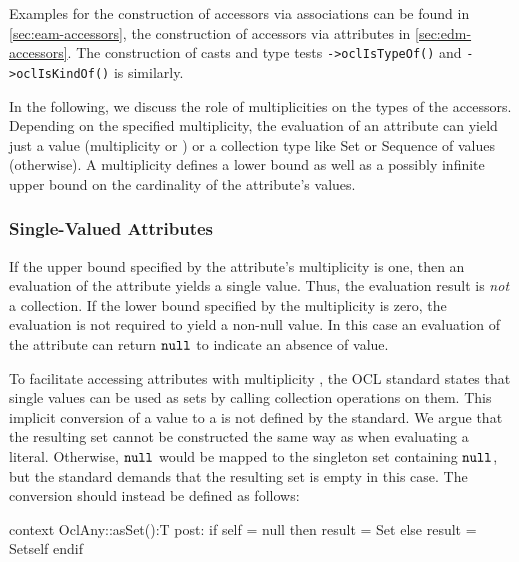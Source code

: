 Examples for the construction of accessors via associations can be found in
\autoref{sec:eam-accessors}, the construction of accessors via attributes in
\autoref{sec:edm-accessors}. The construction of casts and type tests \verb+->oclIsTypeOf()+ and
\verb+->oclIsKindOf()+ is similarly.

In the following, we discuss the role of multiplicities on the types of the
accessors.
Depending on the specified multiplicity, the evaluation of an attribute can
yield just a value (multiplicity  or )
or a collection type like Set or Sequence of values (otherwise).
A multiplicity defines a lower bound as well as a possibly infinite upper
bound on the cardinality of the attribute's values.


\subsubsection{Single-Valued Attributes}\label{sec:single-valued-properties}
If the upper bound specified by the attribute's multiplicity is one,
then an evaluation of the attribute yields a single value.
Thus, the evaluation result is \emph{not} a collection. If the lower bound specified by the
multiplicity is zero, the evaluation is not required to yield a non-null value. In this case an
evaluation of the attribute can return $\mathtt{null}$ to indicate an
absence of value.

To facilitate accessing attributes with multiplicity , the OCL
standard states that single values can be used as sets by calling collection
operations on them. This implicit conversion of a value to a
 is not defined by the standard. We argue that the resulting set
cannot be constructed the same way as when evaluating a 
literal. Otherwise, $\mathtt{null}$ would be mapped to the singleton set
containing $\mathtt{null}$, but the standard demands that
the resulting set is empty in this case. The conversion should instead
be defined as follows:
\begin{ocl}
context OclAny::asSet():T
  post: if self = null then result = Set{}
        else result = Set{self} endif
\end{ocl}

